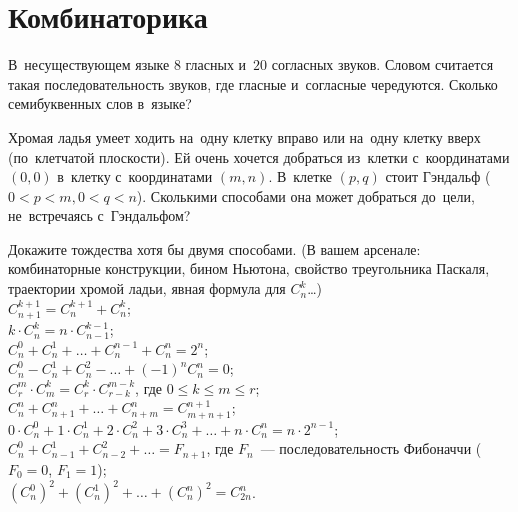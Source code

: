 
\section*{Комбинаторика}


\begin{problems}

\item
В~несуществующем языке $8$ гласных и~$20$ согласных звуков.
Словом считается такая последовательность звуков, где гласные и~согласные
чередуются.
Сколько семибуквенных слов в~языке?

\item
Хромая ладья умеет ходить на~одну клетку вправо или на~одну клетку вверх
(по~клетчатой плоскости).
Ей очень хочется добраться из~клетки с~координатами $(0, 0)$ в~клетку
с~координатами $(m, n)$.
В~клетке $(p, q)$ стоит Гэндальф ($0 < p < m, 0 < q < n$).
Сколькими способами она может добраться до~цели, не~встречаясь с~Гэндальфом?

\item
Докажите тождества хотя бы двумя способами.
(В вашем арсенале:
комбинаторные конструкции, бином Ньютона, свойство треугольника Паскаля,
траектории хромой ладьи, явная формула для $C_{n}^{k}$\ldots)
\\[0.3ex]
\subproblem
$C_{n+1}^{k+1} = C_{n}^{k+1} + C_{n}^{k}$;
\\[0.5ex]
\subproblem
$k \cdot C_{n}^{k} = n \cdot C_{n-1}^{k-1}$;
\\[0.5ex]
\subproblem
$C_{n}^{0} + C_{n}^{1} + \ldots + C_{n}^{n-1} + C_{n}^{n} = 2^{n}$;
\\[0.5ex]
\subproblem
$C_{n}^{0} - C_{n}^{1} + C_{n}^{2} - \ldots + (-1)^n C_{n}^{n} = 0$;
\\[0.5ex]
\subproblem
$C_{r}^{m} \cdot C_{m}^{k} = C_{r}^{k} \cdot C_{r-k}^{m-k}$,
где $0 \leq k \leq m \leq r$;
\\[0.5ex]
\subproblem
$C_{n}^{n} + C_{n+1}^{n} + \ldots + C_{n+m}^{n} = C_{m+n+1}^{n+1}$;
\\[0.5ex]
\subproblem
\(
    0 \cdot C_{n}^{0} + 1 \cdot C_{n}^{1} + 2 \cdot C_{n}^{2} +
    3 \cdot C_{n}^{3} + \ldots + n \cdot C_{n}^{n}
=
    n \cdot 2^{n-1}
\);
\\[0.5ex]
\subproblem
$C_{n}^{0} + C_{n-1}^{1} + C_{n-2}^{2} + \ldots = F_{n+1}$,
где $F_{n}$~--- последовательность Фибоначчи ($F_{0} = 0$, $F_{1} = 1$);
\\[0.5ex]
\subproblem
$(C_{n}^{0})^2 + (C_{n}^{1})^2 + \ldots + (C_{n}^{n})^2 = C_{2n}^{n}$.


\end{problems}
